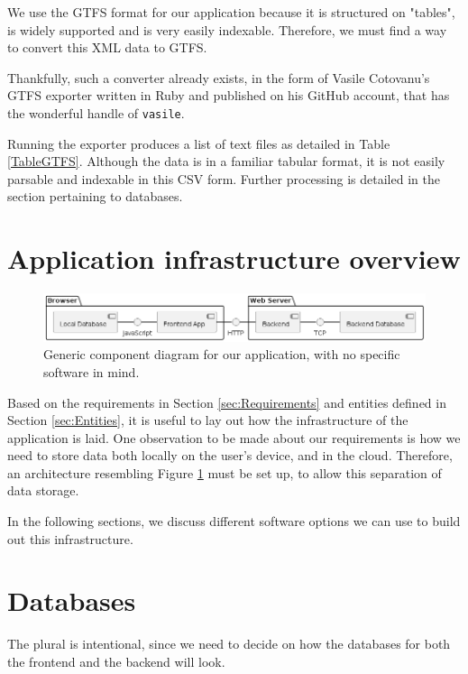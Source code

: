We use the GTFS format for our application because it is structured on "tables", is widely supported and is very easily indexable. Therefore, we must find a way to convert this XML data to GTFS.

Thankfully, such a converter already exists, in the form of Vasile Cotovanu's GTFS exporter \cite{VasileRubyExporter} written in Ruby and published on his GitHub account, that has the wonderful handle of \verb|vasile|.

Running the exporter produces a list of text files as detailed in Table \ref{TableGTFS}. Although the data is in a familiar tabular format, it is not easily parsable and indexable in this CSV form. Further processing is detailed in the section pertaining to databases.

\section{Application infrastructure overview}

\begin{figure}[htbp]
    \centering
    \includegraphics[width=\textwidth]{./figures/ch4_component-diagram.png}
    \caption{Generic component diagram for our application, with no specific software in mind.}
    \label{FigGenericComponentDiagram}
\end{figure}

Based on the requirements in Section \ref{sec:Requirements} and entities defined in Section \ref{sec:Entities}, it is useful to lay out how the infrastructure of the application is laid. One observation to be made about our requirements is how we need to store data both locally on the user's device, and in the cloud. Therefore, an architecture resembling Figure \ref{FigGenericComponentDiagram} must be set up, to allow this separation of data storage.

In the following sections, we discuss different software options we can use to build out this infrastructure.

\section{Databases}
The plural is intentional, since we need to decide on how the databases for both the frontend and the backend will look.

